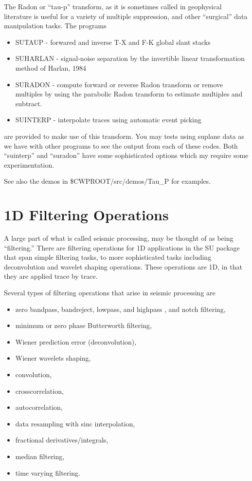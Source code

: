 {{{{{{{The Radon or ``tau-p'' transform, as it is sometimes called in
geophysical literature is useful for a variety of multiple suppression,
and other ``surgical'' data manipulation tasks.
The programs
\begin{itemize}
\item SUTAUP - forwared and inverse T-X and F-K global slant stacks
\item SUHARLAN - signal-noise separation by the invertible linear
transformation method of Harlan, 1984
\item SURADON - compute forward or reverse Radon transform or remove multiples
by using the parabolic Radon transform to estimate multiples and subtract.
\item SUINTERP - interpolate traces using automatic event picking 
\end{itemize}
are provided to make use of this transform.
You may tests using suplane data as we have with other programs
to see the output from each of these codes. Both ``suinterp'' and ``suradon''
have some sophisticated options which my require some experimentation.

See also the demos in \$CWPROOT/src/demos/Tau\_P  for examples.

\section{1D Filtering Operations}

A large part of what is called seismic processing, may be
thought of as being ``filtering.''
There are filtering operations for 1D applications in
the SU package that span simple filtering tasks, to more
sophisticated tasks including deconvolution and wavelet shaping operations.
These operations are 1D, in that they are applied trace by trace.

Several types of filtering operations that arise in seismic
processing are
\begin{itemize}
\item zero bandpass, bandreject, lowpass, and highpass , and notch filtering,
\item minimum or zero phase Butterworth filtering,
\item Wiener prediction error (deconvolution),
\item Wiener wavelets shaping,
\item convolution,
\item crosscorrelation,
\item autocorrelation,
\item data resampling with sinc interpolation,
\item fractional derivatives/integrals,
\item median filtering,
\item time varying filtering.
\end{itemize}

}}}}}}}
